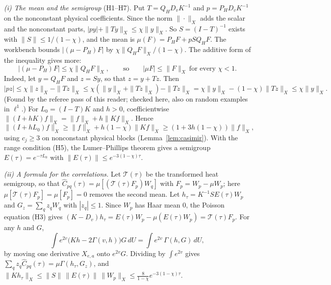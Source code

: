 \emph{(i) The mean and the semigroup} (H1--H7). Put $T=Q_HD_vK^{-1}$ and $p=P_HD_vK^{-1}$ on the nonconstant physical coefficients. Since the norm $\|\cdot\|_X$ adds the scalar and the nonconstant parts, $|py|+\|Ty\|_X\le\chi\|y\|_X$. So $S=(I-T)^{-1}$ exists with $\|S\|\le1/(1-\chi)$, and the mean is $\mu(F)=P_HF+pSQ_HF$. The workbench bounds $|(\mu-P_H)F|$ by $\chi\|Q_HF\|_X/(1-\chi)$. The additive form of the inequality gives more:
\[
|(\mu-P_H)F|\le\chi\|Q_HF\|_X,\qquad\text{so}\qquad|\mu F|\le\|F\|_X\ \text{for every }\chi<1.
\]
Indeed, let $y=Q_HF$ and $z=Sy$, so that $z=y+Tz$. Then
\[
|pz|\le\chi\|z\|_X-\|Tz\|_X\le\chi(\|y\|_X+\|Tz\|_X)-\|Tz\|_X=\chi\|y\|_X-(1-\chi)\|Tz\|_X\le\chi\|y\|_X .
\]
(Found by the referee pass of this reader; checked here, also on random examples in $\ell^1$.)
For $L_0=(I-T)K$ and $h>0$, coefficientwise $\|(I+hK)f\|_X=\|f\|_X+h\|Kf\|_X$. Hence
\[
\|(I+hL_0)f\|_X\ge\|f\|_X+h(1-\chi)\|Kf\|_X\ge(1+3h(1-\chi))\|f\|_X,
\]
using $c_j\ge3$ on nonconstant physical blocks (Lemma~\ref{lem:casimir}). With the range condition (H5), the Lumer--Phillips theorem \cite{LumerPhillips} gives a semigroup $E(\tau)=e^{-\tau L_0}$ with $\|E(\tau)\|\le e^{-3(1-\chi)\tau}$.

\emph{(ii) A formula for the correlations.} Let $\mathcal T(\tau)$ be the transformed heat semigroup, so that $\widehat C_{pq}(\tau)=\mu[(\mathcal T(\tau)F_p)W_q]$ with $F_p=W_p-\mu W_p$; here $\mu[\mathcal T(\tau)F_p]=\mu[F_p]=0$ removes the second mean. Let $h_\tau=K^{-1}SE(\tau)W_p$ and $G_z=\sum_qz_qW_q$ with $|z_q|\le1$. Since $W_p$ has Haar mean $0$, the Poisson equation (H3) gives $(K-D_v)h_\tau=E(\tau)W_p-\mu(E(\tau)W_p)=\mathcal T(\tau)F_p$. For any $h$ and $G$,
\[
\int e^{2v}\bigl(Kh-2\Gamma(v,h)\bigr)G\,dU=\int e^{2v}\,\Gamma(h,G)\,dU,
\]
by moving one derivative $X_{e,a}$ onto $e^{2v}G$. Dividing by $\int e^{2v}$ gives $\sum_qz_q\widehat C_{pq}(\tau)=\mu\Gamma(h_\tau,G_z)$, and $\|Kh_\tau\|_X\le\|S\|\,\|E(\tau)\|\,\|W_p\|_X\le\frac8{1-\chi}e^{-3(1-\chi)\tau}$.

